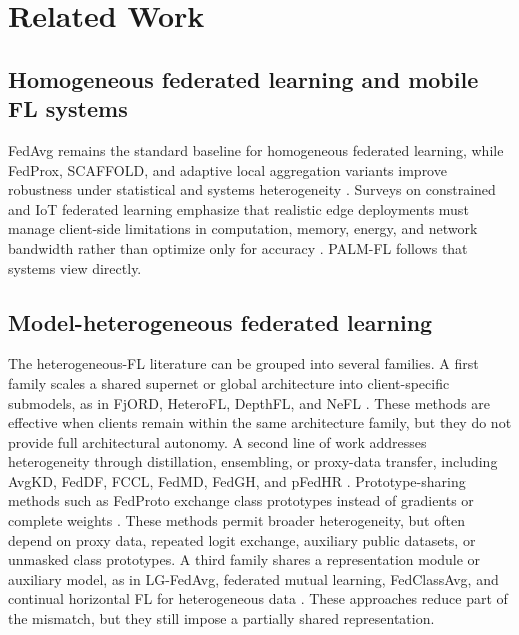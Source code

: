 \documentclass[10pt,journal]{IEEEtran}
\begin{document}
\section{Related Work}
\subsection{Homogeneous federated learning and mobile FL systems}
FedAvg remains the standard baseline for homogeneous federated learning, while FedProx, SCAFFOLD, and adaptive local aggregation variants improve robustness under statistical and systems heterogeneity \cite{fedavg,fedprox,scaffold,fedala}. Surveys on constrained and IoT federated learning emphasize that realistic edge deployments must manage client-side limitations in computation, memory, energy, and network bandwidth rather than optimize only for accuracy \cite{pfeiffer,nguyen}. PALM-FL follows that systems view directly.

\subsection{Model-heterogeneous federated learning}
The heterogeneous-FL literature can be grouped into several families. A first family scales a shared supernet or global architecture into client-specific submodels, as in FjORD, HeteroFL, DepthFL, and NeFL \cite{fjord,heterofl,depthfl,nefl}. These methods are effective when clients remain within the same architecture family, but they do not provide full architectural autonomy. A second line of work addresses heterogeneity through distillation, ensembling, or proxy-data transfer, including AvgKD, FedDF, FCCL, FedMD, FedGH, and pFedHR \cite{avgkd,feddf,fccl,fedmd,fedgh,pfedhr}. Prototype-sharing methods such as FedProto exchange class prototypes instead of gradients or complete weights \cite{fedproto}. These methods permit broader heterogeneity, but often depend on proxy data, repeated logit exchange, auxiliary public datasets, or unmasked class prototypes. A third family shares a representation module or auxiliary model, as in LG-FedAvg, federated mutual learning, FedClassAvg, and continual horizontal FL for heterogeneous data \cite{lgfedavg,fml,fedclassavg,mori}. These approaches reduce part of the mismatch, but they still impose a partially shared representation.
\end{document}
